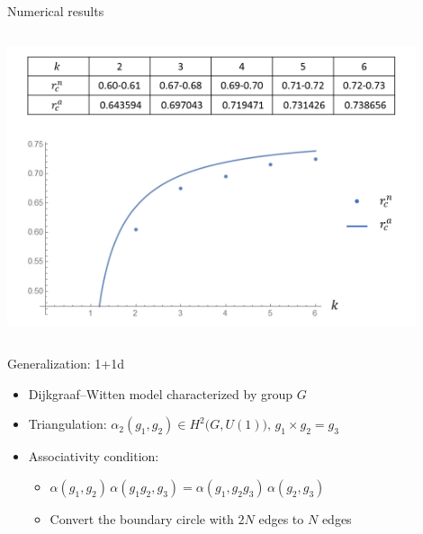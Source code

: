 \documentclass{fdubeamer}
\begin{document}
\begin{frame}{Numerical results}
\begin{columns}[T]
    \centering
    \includegraphics[width=0.9\textwidth]{images/holographic/a-k+1-coupling.png}

\end{columns}


\end{frame}

\begin{frame}{Generalization: 1+1d}

\begin{itemize}
  \item Dijkgraaf--Witten model characterized by group $G$
  \item Triangulation: $\alpha_2(g_1, g_2) \in H^2 \bigl(G, U(1)\bigr), \, g_1 \times g_2 = g_3$
  \item Associativity condition:

    \begin{itemize}
      \item $\alpha(g_1, g_2) \, \alpha(g_1 g_2, g_3) = \alpha(g_1, g_2 g_3) \, \alpha(g_2, g_3)$ \quad
        \begingroup
          \tikzset{x=0.6em, y=0.6em}
        \endgroup
      \item Convert the boundary circle with $2N$ edges to $N$ edges
    \end{itemize}
\end{itemize}

\begin{center}
  \scriptsize
  \tikzset{x=1em, y=1em, node font=\tiny}
\end{center}


\end{frame}
\end{document}
